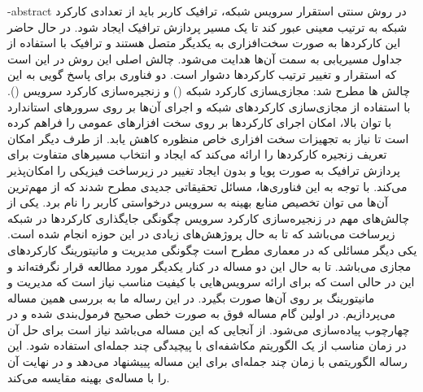 
\fa-abstract{
    در روش سنتی استقرار سرویس شبکه، ترافیک کاربر باید از تعدادی کارکرد شبکه به ترتیب معینی عبور کند تا یک مسیر پردازش ترافیک ایجاد شود.
    در حال حاضر این کارکردها به صورت سخت‌افزاری به یکدیگر متصل هستند و ترافیک با استفاده از جداول مسیریابی به سمت آن‌ها هدایت می‌شود.
    چالش اصلی این روش در این است که استقرار و تغییر ترتیب کارکردها دشوار است.
    دو فناوری برای پاسخ گویی به این چالش ها مطرح شد:
    مجازی‌‍سازی کارکرد شبکه () و زنجیره‌سازی کارکرد سرویس ().
    با استفاده از مجازی‌سازی کارکردهای شبکه و اجرای آن‌ها بر روی سرورهای استاندارد با توان بالا، امکان اجرای کارکردها بر روی سخت افزارهای عمومی را فراهم کرده است
    تا نیاز به تجهیزات سخت افزاری خاص منظوره کاهش یابد.
    از طرف دیگر  امکان تعریف زنجیره کارکردها را ارائه می‌کند
    که ایجاد و انتخاب مسیرهای متفاوت برای پردازش ترافیک به صورت پویا و بدون ایجاد تغییر در زیرساخت فیزیکی را امکان‌پذیر می‌کند.
    با توجه به این فناوری‌ها، مسائل تحقیقاتی جدیدی مطرح شدند که از مهم‌ترین آن‌ها می توان تخصیص منابع بهینه به سرویس درخواستی کاربر را نام برد.
    یکی از چالش‌های مهم در زنجیره‌سازی کارکرد سرویس چگونگی جایگذاری کارکرد‌ها در شبکه زیرساخت می‌باشد که تا به حال پروژهش‌های زیادی در این حوزه انجام شده است.
    یکی دیگر مسائلی که در معماری  مطرح است چگونگی مدیریت و مانیتورینگ کارکردهای مجازی می‌باشد. تا به حال این دو مساله در کنار یکدیگر مورد مطالعه قرار نگرفته‌اند
    و این در حالی است که برای ارائه سرویس‌هایی با کیفیت مناسب نیاز است که مدیریت و مانیتورینگ بر روی آن‌ها صورت بگیرد.
    در این رساله ما به بررسی همین مساله می‌پردازیم.
    در اولین گام مساله فوق به صورت خطی صحیح فرمول‌بندی شده و در چهارچوب  پیاده‌سازی می‌شود.
    از آنجایی که این مساله  می‌باشد نیاز است برای حل آن در زمان مناسب از یک الگوریتم مکاشفه‌ای با پیچیدگی چند جمله‌ای استفاده شود.
    این رساله الگوریتمی با زمان چند جمله‌ای برای این مساله پییشنهاد می‌دهد و در نهایت آن را با مساله‌ی بهینه مقایسه می‌کند.  
}





\AUTtitle
